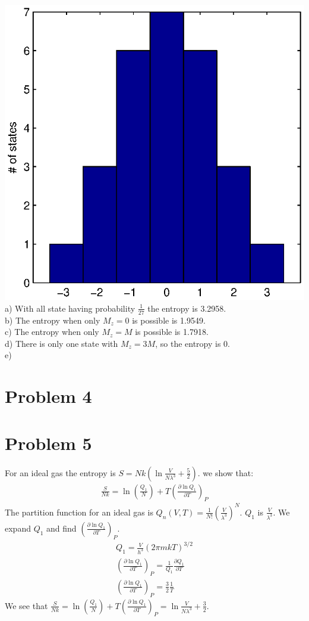 \documentclass[a4paper,11pt]{article}
\numberwithin{equation}{section}
\begin{document}
\includegraphics{p3}
\\
a) With all state having probability $\frac{1}{27}$ the entropy is 3.2958.\\
b) The entropy when only $M_z=0$ is possible is 1.9549. \\
c) The entropy when only $M_z=M$ is possible is 1.7918. \\
d) There is only one state with $M_z=3M$, so the entropy is 0.\\
e)


\section{Problem 4}


\section{Problem 5}
For an ideal gas the entropy is $S=Nk\left(\ln{\frac{V}{N\lambda ^3}}+\frac{5}{2} \right)$.
we show that:
\begin{gather}
 \frac{S}{Nk}=\ln{(\frac{Q_1}{N})}+T(\frac{\partial \ln{Q_1}}{\partial T})_P
\end{gather}
The partition function for an ideal gas is $Q_n(V,T)=\frac{1}{N!}(\frac{V}{\lambda ^3})^N$.
$Q_1$ is $\frac{V}{\lambda ^3}$. We expand $Q_1$ and find $(\frac{\partial \ln{Q_1}}{\partial T})_P$.
\begin{gather}
 Q_1=\frac{V}{h^3}(2\pi mkT)^{3/2}\\
 (\frac{\partial \ln{Q_1}}{\partial T})_P=\frac{1}{Q_1}\frac{\partial Q_1}{\partial T}\\
 (\frac{\partial \ln{Q_1}}{\partial T})_P=\frac{3}{2}\frac{1}{T}
\end{gather}
We see that $\frac{S}{Nk}=\ln{(\frac{Q_1}{N})}+T(\frac{\partial \ln{Q_1}}{\partial T})_P=\ln{\frac{V}{N\lambda ^3}+\frac{3}{2}}$.
\end{document}
